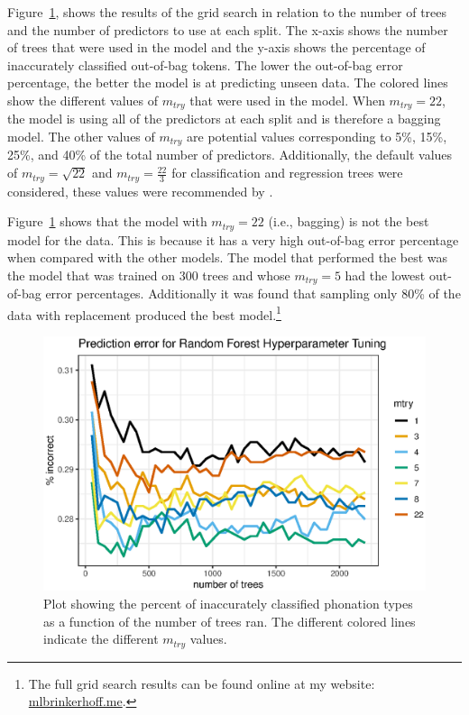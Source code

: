Figure~\ref{fig:mtry_number}, shows the results of the grid search in relation to the number of trees and the number of predictors to use at each split. The x-axis shows the number of trees that were used in the model and the y-axis shows the percentage of inaccurately classified out-of-bag tokens. The lower the out-of-bag error percentage, the better the model is at predicting unseen data. The colored lines show the different values of $m_{try}$ that were used in the model. When $m_{try} = 22$, the model is using all of the predictors at each split and is therefore a bagging model. The other values of $m_{try}$ are potential values corresponding to 5\%, 15\%, 25\%, and 40\% of the total number of predictors. Additionally, the default values of $m_{try} = \sqrt{22}$ and $m_{try} = \frac{22}{3}$ for classification and regression trees were considered, these values were recommended by \citet{boehmkeHandsOnMachineLearning2019}. 

Figure~\ref{fig:mtry_number} shows that the model with $m_{try} = 22$ (i.e., bagging) is not the best model for the data. This is because it has a very high out-of-bag error percentage when compared with the other models. The model that performed the best was the model that was trained on 300 trees and whose $m_{try} = 5$ had the lowest out-of-bag error percentages. Additionally it was found that sampling only 80\% of the data with replacement produced the best model.\footnote{The full grid search results can be found online at my website: \href{mlbrinkerhoff.me}{mlbrinkerhoff.me}.}

\begin{figure}[h!]
    \centering
    \includegraphics[width = 0.9\linewidth]{images/RandomForest/tree_num_dur.eps}
    \caption{Plot showing the percent of inaccurately classified phonation types as a function of the number of trees ran. The different colored lines indicate the different $m_{try}$ values.}
    \label{fig:mtry_number}
\end{figure}

